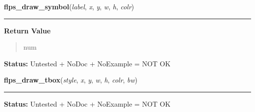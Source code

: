     \label{xformslib:library:flps_draw_symbol}

    \vspace{0.5ex}

\hspace{.8\funcindent}\begin{boxedminipage}{\funcwidth}

    \raggedright \textbf{flps\_draw\_symbol}(\textit{label}, \textit{x}, \textit{y}, \textit{w}, \textit{h}, \textit{colr})

    \vspace{-1.5ex}

    \rule{\textwidth}{0.5\fboxrule}
\setlength{\parskip}{2ex}
\setlength{\parskip}{1ex}
      \textbf{Return Value}
    \vspace{-1ex}

      \begin{quote}
      num

      \end{quote}

\textbf{Status:} Untested + NoDoc + NoExample = NOT OK



    \end{boxedminipage}

    \label{xformslib:library:flps_draw_tbox}

    \vspace{0.5ex}

\hspace{.8\funcindent}\begin{boxedminipage}{\funcwidth}

    \raggedright \textbf{flps\_draw\_tbox}(\textit{style}, \textit{x}, \textit{y}, \textit{w}, \textit{h}, \textit{colr}, \textit{bw})

    \vspace{-1.5ex}

    \rule{\textwidth}{0.5\fboxrule}
\setlength{\parskip}{2ex}
\setlength{\parskip}{1ex}
\textbf{Status:} Untested + NoDoc + NoExample = NOT OK



    \end{boxedminipage}

    \label{xformslib:library:flps_draw_text}

